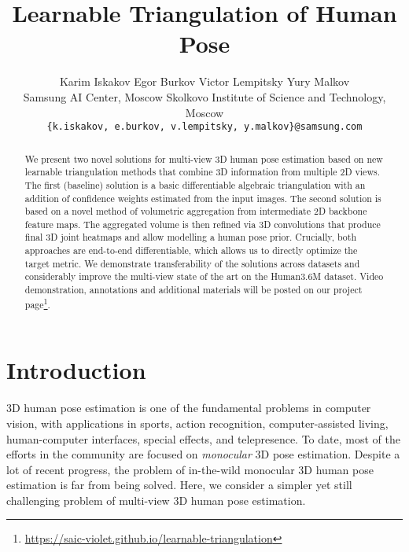 \documentclass[10pt,twocolumn,letterpaper]{article}
\begin{document}
\title{Learnable Triangulation of Human Pose}


\author{Karim Iskakov  \quad Egor Burkov  \quad Victor Lempitsky  \quad  Yury Malkov  
\vspace{1.5mm}\\
Samsung AI Center, Moscow \quad Skolkovo Institute of Science and Technology, Moscow\\
{\tt\small \{k.iskakov, e.burkov, v.lempitsky, y.malkov\}@samsung.com}
}


\maketitle
\begin{abstract}
We present two novel solutions for multi-view 3D human pose estimation based on new learnable triangulation methods that combine 3D information from multiple 2D views. The first (baseline) solution is a basic differentiable algebraic triangulation with an addition of confidence weights estimated from the input images. The second solution is based on a novel method of volumetric aggregation from intermediate 2D backbone feature maps. The aggregated volume is then refined via 3D convolutions that produce final 3D joint heatmaps and allow modelling a human pose prior. Crucially, both approaches are end-to-end differentiable, which allows us to directly optimize the target metric. We demonstrate transferability of the solutions across datasets and considerably improve the multi-view state of the art on the Human3.6M dataset. Video demonstration, annotations and additional materials will be posted on our project page\footnote{\url{https://saic-violet.github.io/learnable-triangulation}}.
\end{abstract}

\section{Introduction}
3D human pose estimation is one of the fundamental problems in computer vision, with applications in sports, action recognition, computer-assisted living, human-computer interfaces, special effects, and telepresence. To  date, most of the efforts in the community are focused on \textit{monocular} 3D pose estimation. Despite a lot of recent progress, the problem of in-the-wild monocular 3D human pose estimation is far from being solved. Here, we consider a simpler yet still challenging problem of multi-view 3D human pose estimation.
\end{document}
